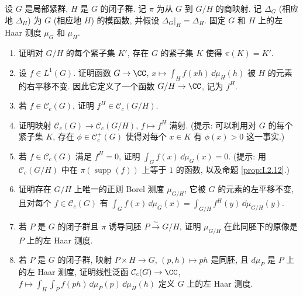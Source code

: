 \begin{exercise}
\label{ex:I.5.3.5}
设 $G$ 是局部紧群, $H$ 是 $G$ 的闭子群. 记 $\pi$ 为从 $G$ 到 $G/H$ 的商映射. 记 $\Delta_G$ (相应地 $\Delta_H$) 为 $G$ (相应地 $H$) 的模函数, 并假设 $\Delta_G|_H = \Delta_H$. 固定 $G$ 和 $H$ 上的左 Haar 测度 $\mu_G$ 和 $\mu_H$.
\begin{enumerate}
\item[(a)] 证明对 $G/H$ 的每个紧子集 $K'$, 存在 $G$ 的紧子集 $K$ 使得 $\pi(K) = K'$.
\item[(b)] 设 $f \in L^1(G)$. 证明函数 $G \to \CC$, $x \longmapsto \int_H f(xh)\,\dd\mu_H(h)$ 被 $H$ 的元素的右平移不变. 因此它定义了一个函数 $G/H \to \CC$, 记为 $f^H$.
\item[(c)] 若 $f \in \mathcal{C}_c(G)$, 证明 $f^H \in \mathcal{C}_c(G/H)$.
\item[(d)] 证明映射 $\mathcal{C}_c(G) \to \mathcal{C}_c(G/H)$, $f \longmapsto f^H$ 满射. (提示: 可以利用对 $G$ 的每个紧子集 $K$, 存在 $\phi \in \mathcal{C}_c^+(G)$ 使得对每个 $x \in K$ 有 $\phi(x) > 0$ 这一事实.)
\item[(e)] 若 $f \in \mathcal{C}_c(G)$ 满足 $f^H = 0$, 证明 $\int_G f(x)\,\dd\mu_G(x) = 0$. (提示: 用 $\mathcal{C}_c(G/H)$ 中在 $\pi(\operatorname{supp}(f))$ 上等于 $1$ 的函数, 以及命题 \ref{prop:I.2.12}.)
\item[(f)] 证明存在 $G/H$ 上唯一的正则 Borel 测度 $\mu_{G/H}$, 它被 $G$ 的元素的左平移不变, 且对每个 $f \in \mathcal{C}_c(G)$ 有 $\int_G f(x)\,\dd\mu_G(x) = \int_{G/H}f^H(y)\,\dd\mu_{G/H}(y)$.
\item[(g)] 若 $P$ 是 $G$ 的闭子群且 $\pi$ 诱导同胚 $P \xrightarrow{\sim} G/H$, 证明 $\mu_{G/H}$ 在此同胚下的原像是 $P$ 上的左 Haar 测度.
\item[(h)] 若 $P$ 是 $G$ 的闭子群, 映射 $P \times H \to G$, $(p, h) \longmapsto ph$ 是同胚, 且 $d\mu_P$ 是 $P$ 上的左 Haar 测度, 证明线性泛函 $\mathcal{C}_c(G) \to \CC$, $f \longmapsto \int_H\int_P f(ph)\,\dd\mu_P(p)\,\dd\mu_H(h)$ 定义 $G$ 上的左 Haar 测度.
\end{enumerate}
\end{exercise}

